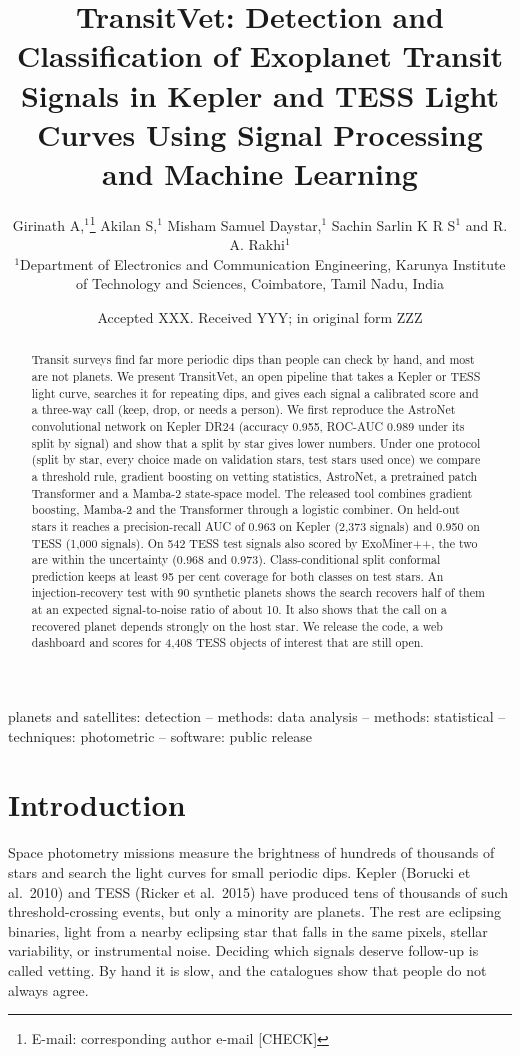\documentclass[fleqn,usenatbib]{mnras}
\title[Finding exoplanet candidates with TransitVet]{TransitVet: Detection and Classification of Exoplanet Transit Signals in Kepler and TESS Light Curves Using Signal Processing and Machine Learning}
\author[Girinath A et al.]{
Girinath A,$^{1}$\thanks{E-mail: corresponding author e-mail [CHECK]}
Akilan S,$^{1}$
Misham Samuel Daystar,$^{1}$
Sachin Sarlin K R S$^{1}$
and R. A. Rakhi$^{1}$
\\
$^{1}$Department of Electronics and Communication Engineering, Karunya Institute of Technology and Sciences, Coimbatore, Tamil Nadu, India
}
\date{Accepted XXX. Received YYY; in original form ZZZ}
\begin{document}
\label{firstpage}
\pagerange{\pageref{firstpage}--\pageref{lastpage}}
\maketitle

\begin{abstract}
Transit surveys find far more periodic dips than people can check by hand, and most are not planets. We present TransitVet, an open pipeline that takes a Kepler or TESS light curve, searches it for repeating dips, and gives each signal a calibrated score and a three-way call (keep, drop, or needs a person). We first reproduce the AstroNet convolutional network on Kepler DR24 (accuracy 0.955, ROC-AUC 0.989 under its split by signal) and show that a split by star gives lower numbers. Under one protocol (split by star, every choice made on validation stars, test stars used once) we compare a threshold rule, gradient boosting on vetting statistics, AstroNet, a pretrained patch Transformer and a Mamba-2 state-space model. The released tool combines gradient boosting, Mamba-2 and the Transformer through a logistic combiner. On held-out stars it reaches a precision-recall AUC of 0.963 on Kepler (2,373 signals) and 0.950 on TESS (1,000 signals). On 542 TESS test signals also scored by ExoMiner++, the two are within the uncertainty (0.968 and 0.973). Class-conditional split conformal prediction keeps at least 95 per cent coverage for both classes on test stars. An injection-recovery test with 90 synthetic planets shows the search recovers half of them at an expected signal-to-noise ratio of about 10. It also shows that the call on a recovered planet depends strongly on the host star. We release the code, a web dashboard and scores for 4,408 TESS objects of interest that are still open.
\end{abstract}

\begin{keywords}
planets and satellites: detection -- methods: data analysis -- methods: statistical -- techniques: photometric -- software: public release
\end{keywords}

\section{Introduction}

Space photometry missions measure the brightness of hundreds of thousands of stars and search the light curves for small periodic dips. Kepler (Borucki et al.~2010) and TESS (Ricker et al.~2015) have produced tens of thousands of such threshold-crossing events, but only a minority are planets. The rest are eclipsing binaries, light from a nearby eclipsing star that falls in the same pixels, stellar variability, or instrumental noise. Deciding which signals deserve follow-up is called vetting. By hand it is slow, and the catalogues show that people do not always agree.
\end{document}
